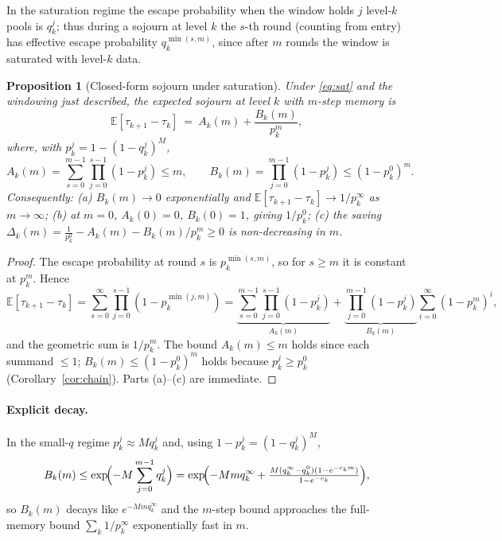 \documentclass[11pt,a4paper]{article}
\newtheorem{proposition}[theorem]{Proposition}
\newcommand{\E}{\mathbb{E}}
\begin{document}
In the saturation regime the escape probability when the window holds
$j$ level-$k$ pools is $q_k^j$; thus during a sojourn at level $k$ the
$s$-th round (counting from entry) has effective escape probability
$q_k^{\min(s,m)}$, since after $m$ rounds the window is saturated with
level-$k$ data.

\begin{proposition}[Closed-form sojourn under saturation]
\label{prop:sojourn-sat}
  Under \eqref{eq:sat} and the windowing just described, the expected
  sojourn at level $k$ with $m$-step memory is
  \begin{equation}
    \E[\tau_{k+1}-\tau_k]
    \ =\ A_k(m)+\frac{B_k(m)}{p_k^m},
    \label{eq:sojourn-sat}
  \end{equation}
  where, with $p_k^j=1-(1-q_k^j)^M$,
  \[
    A_k(m)=\sum_{s=0}^{m-1}\prod_{j=0}^{s-1}(1-p_k^j)\le m,
    \qquad
    B_k(m)=\prod_{j=0}^{m-1}(1-p_k^j)\le(1-p_k^0)^m.
  \]
  Consequently:
  \emph{(a)} $B_k(m)\to0$ exponentially and
  $\E[\tau_{k+1}-\tau_k]\to1/p_k^\infty$ as $m\to\infty$;
  \emph{(b)} at $m=0$, $A_k(0)=0$, $B_k(0)=1$, giving $1/p_k^0$;
  \emph{(c)} the saving $\Delta_k(m)=\tfrac1{p_k^0}-A_k(m)-B_k(m)/p_k^m\ge0$
  is non-decreasing in $m$.
\end{proposition}

\begin{proof}
  The escape probability at round $s$ is $p_k^{\min(s,m)}$, so for
  $s\ge m$ it is constant at $p_k^m$.  Hence
  \[
    \E[\tau_{k+1}-\tau_k]
    =\sum_{s=0}^{\infty}\prod_{j=0}^{s-1}(1-p_k^{\min(j,m)})
    =\underbrace{\sum_{s=0}^{m-1}\prod_{j=0}^{s-1}(1-p_k^j)}_{A_k(m)}
     +\underbrace{\prod_{j=0}^{m-1}(1-p_k^j)}_{B_k(m)}
       \sum_{i=0}^{\infty}(1-p_k^m)^i,
  \]
  and the geometric sum is $1/p_k^m$.  The bound $A_k(m)\le m$ holds
  since each summand $\le1$; $B_k(m)\le(1-p_k^0)^m$ holds because
  $p_k^j\ge p_k^0$ (Corollary~\ref{cor:chain}).  Parts (a)--(c) are
  immediate.
\end{proof}

\paragraph{Explicit decay.}
In the small-$q$ regime $p_k^j\approx Mq_k^j$ and, using
$1-p_k^j=(1-q_k^j)^M$,
\[
  B_k(m)\le\exp\!\Bigl(-M\sum_{j=0}^{m-1}q_k^j\Bigr)
  =\exp\!\Bigl(-Mmq_k^\infty
    +\tfrac{M(q_k^\infty-q_k^0)(1-e^{-c_km})}{1-e^{-c_k}}\Bigr),
\]
so $B_k(m)$ decays like $e^{-Mmq_k^\infty}$ and the $m$-step bound
approaches the full-memory bound $\sum_k1/p_k^\infty$ exponentially fast
in $m$.
\end{document}
